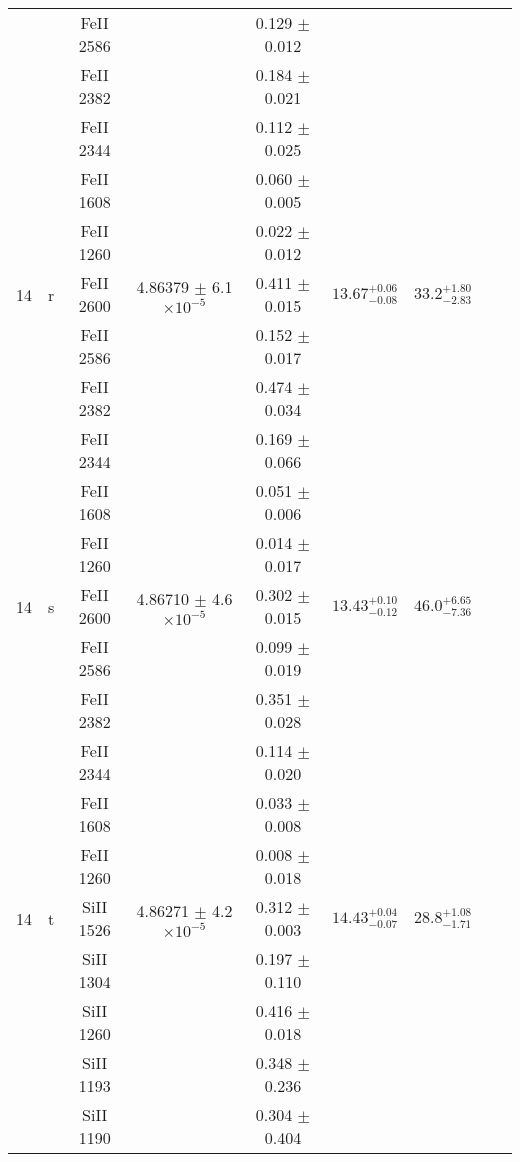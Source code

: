 \documentclass[12pt]{article}
\begin{document}
\begin{footnotesize}
\begin{longtable}{ c c c c c c c c c}
  &   & FeII     2586  &  &  0.129 $\pm$ 0.012   &   &     & 	 & \\ 
  &   & FeII     2382  &  &  0.184 $\pm$ 0.021   &   &     & 	 & \\ 
  &   & FeII     2344  &  &  0.112 $\pm$ 0.025   &   &     & 	 & \\ 
  &   & FeII     1608  &  &  0.060 $\pm$ 0.005   &   &     & 	 & \\ 
  &   & FeII     1260  &  &  0.022 $\pm$ 0.012   &   &     & 	 & \\ 
      14  & r  & FeII     2600  &  4.86379 $\pm$ 6.1 $\times 10^{-5}$   &  0.411 $\pm$ 0.015   & $13.67_{ - 0.08}^{ + 0.06}$  & $33.2_{ - 2.83}^{ + 1.80}$    & 	 & \\ 
  &   & FeII     2586  &  &  0.152 $\pm$ 0.017   &   &     & 	 & \\ 
  &   & FeII     2382  &  &  0.474 $\pm$ 0.034   &   &     & 	 & \\ 
  &   & FeII     2344  &  &  0.169 $\pm$ 0.066   &   &     & 	 & \\ 
  &   & FeII     1608  &  &  0.051 $\pm$ 0.006   &   &     & 	 & \\ 
  &   & FeII     1260  &  &  0.014 $\pm$ 0.017   &   &     & 	 & \\ 
      14  & s  & FeII     2600  &  4.86710 $\pm$ 4.6 $\times 10^{-5}$   &  0.302 $\pm$ 0.015   & $13.43_{ - 0.12}^{ + 0.10}$  & $46.0_{ - 7.36}^{ + 6.65}$    & 	 & \\ 
  &   & FeII     2586  &  &  0.099 $\pm$ 0.019   &   &     & 	 & \\ 
  &   & FeII     2382  &  &  0.351 $\pm$ 0.028   &   &     & 	 & \\ 
  &   & FeII     2344  &  &  0.114 $\pm$ 0.020   &   &     & 	 & \\ 
  &   & FeII     1608  &  &  0.033 $\pm$ 0.008   &   &     & 	 & \\ 
  &   & FeII     1260  &  &  0.008 $\pm$ 0.018   &   &     & 	 & \\ 
      14  & t  & SiII     1526  &  4.86271 $\pm$ 4.2 $\times 10^{-5}$   &  0.312 $\pm$ 0.003   & $14.43_{ - 0.07}^{ + 0.04}$  & $28.8_{ - 1.71}^{ + 1.08}$    & 	 & \\ 
  &   & SiII     1304  &  &  0.197 $\pm$ 0.110   &   &     & 	 & \\ 
  &   & SiII     1260  &  &  0.416 $\pm$ 0.018   &   &     & 	 & \\ 
  &   & SiII     1193  &  &  0.348 $\pm$ 0.236   &   &     & 	 & \\ 
  &   & SiII     1190  &  &  0.304 $\pm$ 0.404   &   &     & 	 & \\ 

\end{longtable}
\end{footnotesize}
\end{document}
